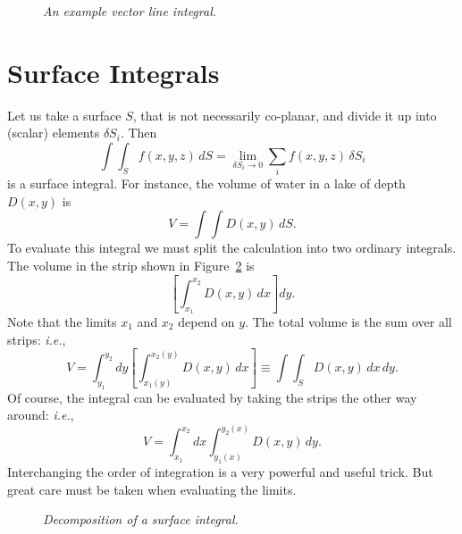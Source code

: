 \begin{figure}
\epsfysize=2.25in
\centerline{}
\caption{\em An example vector line integral.}\label{f13a}
\end{figure}

\section{Surface Integrals}
Let us take a surface $S$, that is not necessarily co-planar, and divide it up
into (scalar) elements $\delta S_i$. Then
\begin{equation}
\int\!\int_S f(x,y,z)\, dS = \lim_{\delta S_i\rightarrow 0}\sum_i f(x,y,z)\,
\delta S_i
\end{equation}
is a surface integral. For instance, the volume of water in a lake of depth
$D(x,y)$ is
\begin{equation}
V= \int\!\int D(x,y)\,dS.
\end{equation}
To evaluate this integral we must split the calculation into two ordinary integrals.
The volume in the strip shown in Figure~\ref{f13} is
\begin{equation}
\left[\int_{x_1}^{x_2} D(x,y)\,dx\right]dy.
\end{equation}
Note that the limits $x_1$ and $x_2$ depend on $y$. The total volume is the sum
over all strips: {\em i.e.}, 
\begin{equation}
V = \int_{y_1}^{y_2} dy\left[\int_{x_1(y)}^{x_2(y)} D(x,y)\,dx\right]
\equiv \int\!\int_S D(x,y)\,dx\,dy.
\end{equation} 
Of course, the integral can be evaluated by taking the strips the other way around: {\em i.e.}, 
\begin{equation}
V = \int_{x_1}^{x_2} dx \int_{y_1(x)}^{y_2(x)} D(x,y)\,dy.
\end{equation}
Interchanging the order of integration is a very powerful and useful trick. But
great care must be taken when evaluating the limits.
\begin{figure}
\centerline{}
\caption{\em Decomposition of a surface integral.}\label{f13}
\end{figure}

